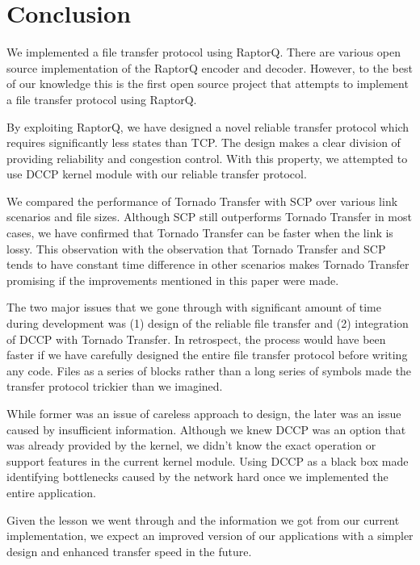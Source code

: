 \documentclass{sig-alternate-10pt}
\begin{document}
\section{Conclusion}
We implemented a file transfer protocol using RaptorQ. There are various open
source implementation of the RaptorQ encoder and decoder. However, to the best
of our knowledge this is the first open source project that attempts to
implement a file transfer protocol using RaptorQ. 

By exploiting RaptorQ, we have designed a novel reliable transfer protocol which
requires significantly less states than TCP. The design makes a clear division
of providing reliability and congestion control. With this property, we attempted
to use DCCP kernel module with our reliable transfer protocol.

We compared the performance of Tornado Transfer with SCP over various link scenarios and
file sizes. Although SCP still outperforms Tornado Transfer in most cases, we have
confirmed that Tornado Transfer can be faster when the link is lossy. This observation
with the observation that Tornado Transfer and SCP tends to have constant time difference
in other scenarios makes Tornado Transfer promising if the improvements mentioned in this
paper were made.

The two major issues that we gone through with significant amount of time during
development was (1) design of the reliable file transfer and (2) integration of
DCCP with Tornado Transfer. In retrospect, the process would have been faster if we have
carefully designed the entire file transfer protocol before writing any code.
Files as a series of blocks rather than a long series of symbols made the
transfer protocol trickier than we imagined. 

While former was an issue of careless approach to design, the later was an issue
caused by insufficient information. Although we knew DCCP was an option that was
already provided by the kernel, we didn't know the exact operation or support
features in the current kernel module. Using DCCP as a black box made
identifying bottlenecks caused by the network hard once we implemented the
entire application.

Given the lesson we went through and the information we got from our current
implementation, we expect an improved version of our applications with a
simpler design and enhanced transfer speed in the future. 



\end{document}
